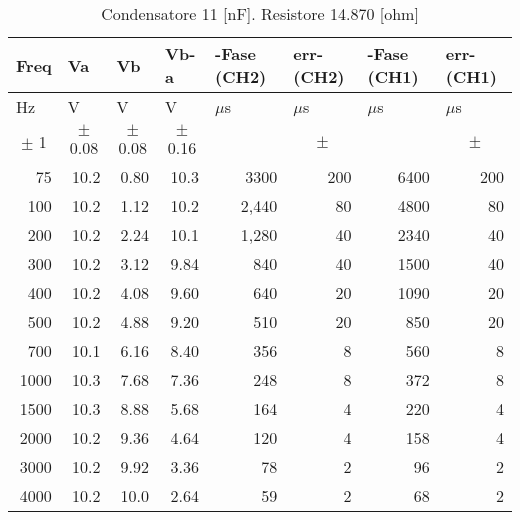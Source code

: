 \begin{table}[H]
\begin{center}
\begin{tabular}{|r|r|r|r|r|r|r|r|}
\hline
\multicolumn{1}{|l|}{Freq} & \multicolumn{1}{l|}{Va} & \multicolumn{1}{l|}{Vb} & \multicolumn{1}{l|}{Vb-a} & \multicolumn{1}{l|}{-Fase (CH2)} & \multicolumn{1}{l|}{err-(CH2)} & \multicolumn{1}{l|}{-Fase (CH1)} & \multicolumn{1}{l|}{err-(CH1)} \\ \hline
\multicolumn{1}{|l|}{Hz} & \multicolumn{1}{l|}{V} & \multicolumn{1}{l|}{V} & \multicolumn{1}{l|}{V} & \multicolumn{1}{l|}{$\mu$s} & \multicolumn{1}{l|}{$\mu$s} & \multicolumn{1}{l|}{$\mu$s} & \multicolumn{1}{l|}{$\mu$s} \\ \hline
\multicolumn{1}{|c|}{$\pm$ 1} & \multicolumn{1}{c|}{$\pm$ 0.08} & \multicolumn{1}{c|}{$\pm$ 0.08} & \multicolumn{1}{c|}{$\pm$ 0.16} & \multicolumn{1}{l|}{} & \multicolumn{1}{c|}{$\pm$ } & \multicolumn{1}{l|}{} & \multicolumn{1}{c|}{$\pm$ } \\ \hline
75 & 10.2 & 0.80 & 10.3 & 3300 & 200 & 6400 & 200 \\ \hline
100 & 10.2 & 1.12 & 10.2 & 2,440 & 80 & 4800 & 80 \\ \hline
200 & 10.2 & 2.24 & 10.1 & 1,280 & 40 & 2340 & 40 \\ \hline
300 & 10.2 & 3.12 & 9.84 & 840 & 40 & 1500 & 40 \\ \hline
400 & 10.2 & 4.08 & 9.60 & 640 & 20 & 1090 & 20 \\ \hline
500 & 10.2 & 4.88 & 9.20 & 510 & 20 & 850 & 20 \\ \hline
700 & 10.1 & 6.16 & 8.40 & 356 & 8 & 560 & 8 \\ \hline
1000 & 10.3 & 7.68 & 7.36 & 248 & 8 & 372 & 8 \\ \hline
1500 & 10.3 & 8.88 & 5.68 & 164 & 4 & 220 & 4 \\ \hline
2000 & 10.2 & 9.36 & 4.64 & 120 & 4 & 158 & 4 \\ \hline
3000 & 10.2 & 9.92 & 3.36 & 78 & 2 & 96 & 2 \\ \hline
4000 & 10.2 & 10.0 & 2.64 & 59 & 2 & 68 & 2 \\ \hline
\end{tabular}
\end{center}
\caption{Condensatore 11 [nF]. Resistore 14.870 [ohm]}
\label{C3_P1_cond1}
\end{table}